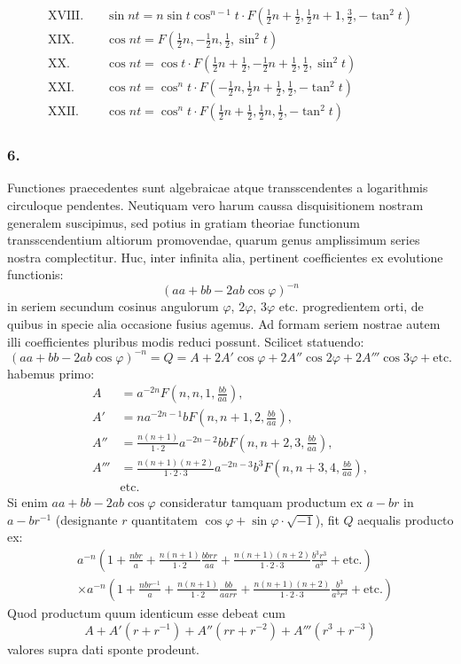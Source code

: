 \documentclass[12pt,a4paper]{article}
\newcommand{\1}{\ensuremath{\mathrlap{\,|\,}}} %
\begin{document}
\begin{align*}
\text{XVIII.} \quad & \sin nt = n\sin t \cos^{n-1} t \cdot F(\tfrac{1}{2}n+\tfrac{1}{2}, \tfrac{1}{2}n+1, \tfrac{3}{2}, -\tan^2 t)\\[4pt]
\text{XIX.} \quad & \cos nt = F(\tfrac{1}{2}n, -\tfrac{1}{2}n, \tfrac{1}{2}, \sin^2 t)\\[4pt]
\text{XX.} \quad & \cos nt = \cos t \cdot F(\tfrac{1}{2}n+\tfrac{1}{2}, -\tfrac{1}{2}n+\tfrac{1}{2}, \tfrac{1}{2}, \sin^2 t)\\[4pt]
\text{XXI.} \quad & \cos nt = \cos^n t \cdot F(-\tfrac{1}{2}n, \tfrac{1}{2}n+\tfrac{1}{2}, \tfrac{1}{2}, -\tan^2 t)\\[4pt]
\text{XXII.} \quad & \cos nt = \cos^n t \cdot F(\tfrac{1}{2}n+\tfrac{1}{2}, \tfrac{1}{2}n, \tfrac{1}{2}, -\tan^2 t)
\end{align*}

\subsubsection*{6.}
Functiones praecedentes sunt algebraicae atque transscendentes a logarithmis circuloque pendentes. Neutiquam vero harum caussa disquisitionem nostram generalem suscipimus, sed potius in gratiam theoriae functionum transscendentium altiorum promovendae, quarum genus amplissimum series nostra complectitur. Huc, inter infinita alia, pertinent coefficientes ex evolutione functionis:
\[(aa + bb - 2ab\cos\varphi)^{-n}\]
in seriem secundum cosinus angulorum $\varphi$, $2\varphi$, $3\varphi$ etc. progredientem orti, de quibus in specie alia occasione fusius agemus. Ad formam seriem nostrae autem illi coefficientes pluribus modis reduci possunt. Scilicet statuendo:
\[(aa + bb - 2ab\cos\varphi)^{-n} = Q = A + 2A'\cos\varphi + 2A''\cos 2\varphi + 2A'''\cos 3\varphi + \text{etc.}\]
habemus primo:
\begin{align*}
A &= a^{-2n}F(n, n, 1, \tfrac{bb}{aa}),\\
A' &= na^{-2n-1}bF(n, n+1, 2, \tfrac{bb}{aa}),\\
A'' &= \tfrac{n(n+1)}{1\cdot 2}a^{-2n-2}bbF(n, n+2, 3, \tfrac{bb}{aa}),\\
A''' &= \tfrac{n(n+1)(n+2)}{1\cdot 2\cdot 3}a^{-2n-3}b^3F(n, n+3, 4, \tfrac{bb}{aa}),\\
&\text{etc.}
\end{align*}
Si enim $aa + bb - 2ab\cos\varphi$ consideratur tamquam productum ex $a - br$ in $a - br^{-1}$ (designante $r$ quantitatem $\cos\varphi + \sin\varphi\cdot\sqrt{-1}$), fit $Q$ aequalis producto ex:
\begin{align*}
&a^{-n}\left(1 + \frac{nbr}{a} + \frac{n(n+1)}{1\cdot 2}\frac{bbrr}{aa} + \frac{n(n+1)(n+2)}{1\cdot 2\cdot 3}\frac{b^3r^3}{a^3} + \text{etc.}\right)\\
&\times a^{-n}\left(1 + \frac{nbr^{-1}}{a} + \frac{n(n+1)}{1\cdot 2}\frac{bb}{aarr} + \frac{n(n+1)(n+2)}{1\cdot 2\cdot 3}\frac{b^3}{a^3r^3} + \text{etc.}\right)
\end{align*}
Quod productum quum identicum esse debeat cum
\[A + A'(r+r^{-1}) + A''(rr+r^{-2}) + A'''(r^3+r^{-3})\]
valores supra dati sponte prodeunt.
\end{document}

